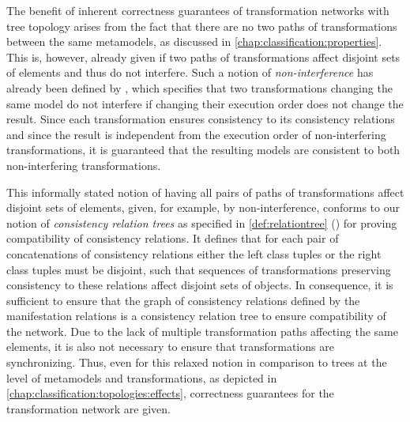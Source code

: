 The benefit of inherent correctness guarantees of transformation networks with tree topology arises from the fact that there are no two paths of transformations between the same metamodels, as discussed in \autoref{chap:classification:properties}.
This is, however, already given if two paths of transformations affect disjoint sets of elements and thus do not interfere.
Such a notion of \emph{non-interference} has already been defined by \textcite{stevens2020BidirectionalTransformationLarge-SoSym}, which specifies that two transformations changing the same model do not interfere if changing their execution order does not change the result.
Since each transformation ensures consistency to its consistency relations and since the result is independent from the execution order of non-interfering transformations, it is guaranteed that the resulting models are consistent to both non-interfering transformations.

This informally stated notion of having all pairs of paths of transformations affect disjoint sets of elements, given, for example, by non-interference, conforms to our notion of \emph{consistency relation trees} as specified in \autoref{def:relationtree} (\pageref{def:relationtree}) for proving compatibility of consistency relations.
It defines that for each pair of concatenations of consistency relations either the left class tuples or the right class tuples must be disjoint, such that sequences of transformations preserving consistency to these relations affect disjoint sets of objects.
In consequence, it is sufficient to ensure that the graph of consistency relations defined by the manifestation relations is a consistency relation tree to ensure compatibility of the network.
Due to the lack of multiple transformation paths affecting the same elements, it is also not necessary to ensure that transformations are synchronizing.
Thus, even for this relaxed notion in comparison to trees at the level of metamodels and transformations, as depicted in \autoref{chap:classification:topologies:effects}, correctness guarantees for the transformation network are given.

